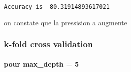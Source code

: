 \documentclass[11pt]{article}
\begin{document}
    \begin{Verbatim}[commandchars=\\\{\}]
Accuracy is  80.31914893617021

    \end{Verbatim}

    on constate que la pressision a augmente

    \subsubsection{k-fold cross validation}\label{k-fold-cross-validation}

    \paragraph{pour max\_depth = 5}\label{pour-max_depth-5}
\end{document}
